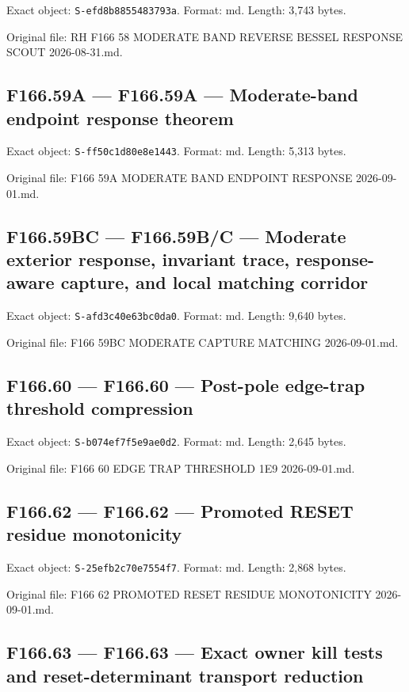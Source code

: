 \documentclass[
  10pt,
  a4paper,
  10pt,
  oneside,
  openany]{book}
\begin{document}
Exact object: \texttt{S-efd8b8855483793a}. Format: md. Length: 3,743
bytes.

Original file: RH F166 58 MODERATE BAND REVERSE BESSEL RESPONSE SCOUT
2026-08-31.md.

\subsection{F166.59A --- F166.59A --- Moderate-band endpoint response
theorem}\label{source-f166-59a}

Exact object: \texttt{S-ff50c1d80e8e1443}. Format: md. Length: 5,313
bytes.

Original file: F166 59A MODERATE BAND ENDPOINT RESPONSE 2026-09-01.md.

\subsection{F166.59BC --- F166.59B/C --- Moderate exterior response,
invariant trace, response-aware capture, and local matching
corridor}\label{source-f166-59bc}

Exact object: \texttt{S-afd3c40e63bc0da0}. Format: md. Length: 9,640
bytes.

Original file: F166 59BC MODERATE CAPTURE MATCHING 2026-09-01.md.

\subsection{F166.60 --- F166.60 --- Post-pole edge-trap threshold
compression}\label{source-f166-60}

Exact object: \texttt{S-b074ef7f5e9ae0d2}. Format: md. Length: 2,645
bytes.

Original file: F166 60 EDGE TRAP THRESHOLD 1E9 2026-09-01.md.

\subsection{F166.62 --- F166.62 --- Promoted RESET residue
monotonicity}\label{source-f166-62}

Exact object: \texttt{S-25efb2c70e7554f7}. Format: md. Length: 2,868
bytes.

Original file: F166 62 PROMOTED RESET RESIDUE MONOTONICITY
2026-09-01.md.

\subsection{F166.63 --- F166.63 --- Exact owner kill tests and
reset-determinant transport reduction}\label{source-f166-63}
\end{document}
